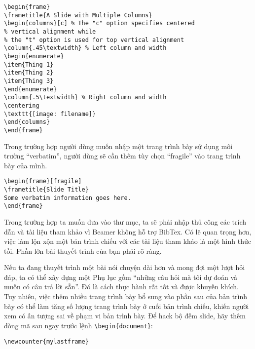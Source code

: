 \documentclass[a4paper,UKenglish,cleveref, autoref, thm-restate]{lipics-v2021}
\begin{document}
\begin{lstlisting}
\begin{frame}
\frametitle{A Slide with Multiple Columns}
\begin{columns}[c] % The "c" option specifies centered 
% vertical alignment while
% the "t" option is used for top vertical alignment
\column{.45\textwidth} % Left column and width
\begin{enumerate}
\item{Thing 1}
\item{Thing 2}
\item{Thing 3}
\end{enumerate}
\column{.5\textwidth} % Right column and width
\centering
\texttt{[image: filename]}
\end{columns}
\end{frame}
\end{lstlisting}

Trong trường hợp người dùng muốn nhập một trang trình bày sử dụng môi trường “verbatim”, người dùng sẽ cần thêm tùy chọn “fragile” vào trang trình bày của mình.

\begin{lstlisting}
\begin{frame}[fragile]
\frametitle{Slide Title}
Some verbatim information goes here.
\end{frame}
\end{lstlisting}

Trong trường hợp ta muốn đưa vào thư mục, ta sẽ phải nhập thủ công các trích dẫn và tài liệu tham khảo vì Beamer không hỗ trợ BibTex. Có lẽ quan trọng hơn, việc làm lộn xộn một bản trình chiếu với các tài liệu tham khảo là một hình thức tồi. Phần lớn bài thuyết trình của bạn phải rõ ràng.

Nếu ta đang thuyết trình một bài nói chuyện dài hơn và mong đợi một lượt hỏi đáp, ta có thể xây dựng một Phụ lục gồm “những câu hỏi mà tôi dự đoán và muốn có câu trả lời sẵn”. Đó là cách thực hành rất tốt và được khuyến khích. Tuy nhiên, việc thêm nhiều trang trình bày bổ sung vào phần sau của bản trình bày có thể làm tăng số lượng trang trình bày ở cuối bản trình chiếu, khiến người xem có ấn tượng sai về phạm vi bản trình bày. Để hack bộ đếm slide, hãy thêm dòng mã sau ngay trước lệnh \verb|\begin{document}|:

\begin{lstlisting}
\newcounter{mylastframe}
\end{lstlisting}
\end{document}
